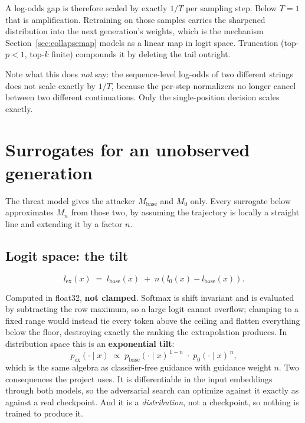 \documentclass[11pt,a4paper]{article}
\begin{document}
A log-odds gap is therefore scaled by exactly $1/T$ per sampling step. Below $T = 1$ that is
amplification. Retraining on those samples carries the sharpened distribution into the next
generation's weights, which is the mechanism Section~\ref{sec:collapsemap} models as a linear map in
logit space. Truncation (top-$p < 1$, top-$k$ finite) compounds it by deleting the tail outright.

Note what this does \emph{not} say: the sequence-level log-odds of two different strings does not
scale exactly by $1/T$, because the per-step normalizers no longer cancel between two different
continuations. Only the single-position decision scales exactly.

\section{Surrogates for an unobserved generation}

The threat model gives the attacker $M_{\mathrm{base}}$ and $M_0$ only. Every surrogate below
approximates $M_n$ from those two, by assuming the trajectory is locally a straight line and
extending it by a factor $n$.

\subsection{Logit space: the tilt}

\begin{equation}
  l_{\mathrm{ex}}(x) \;=\; l_{\mathrm{base}}(x) \;+\; n\left( l_0(x) - l_{\mathrm{base}}(x) \right).
  \label{eq:tilt}
\end{equation}

Computed in float32, \textbf{not clamped}. Softmax is shift invariant and is evaluated by
subtracting the row maximum, so a large logit cannot overflow; clamping to a fixed range would
instead tie every token above the ceiling and flatten everything below the floor, destroying exactly
the ranking the extrapolation produces. In distribution space this is an \textbf{exponential tilt}:
\begin{equation}
  p_{\mathrm{ex}}(\cdot \mid x) \;\propto\; p_{\mathrm{base}}(\cdot \mid x)^{\,1-n} \;\cdot\; p_0(\cdot \mid x)^{\,n},
  \label{eq:exptilt}
\end{equation}
which is the same algebra as classifier-free guidance with guidance weight $n$. Two consequences the
project uses. It is differentiable in the input embeddings through both models, so the adversarial
search can optimize against it exactly as against a real checkpoint. And it is a \emph{distribution},
not a checkpoint, so nothing is trained to produce it.
\end{document}
